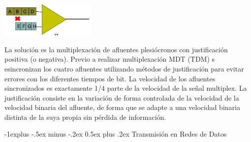 \documentclass[10pt,portrait, twocolumn]{article}
\makeatletter
\renewcommand{\subsection}{\@startsection{subsection}{2}{0mm}%
                                {-1explus -.5ex minus -.2ex}%
                                {0.5ex plus .2ex}%
                                {\normalfont\normalsize\bfseries}}
\makeatother
\begin{document}
\begin{center}
\includegraphics[width=0.35\textwidth]{Problemas}
\end{center}

La solución es la multiplexación de afluentes plesiócronos con justificación positiva (o negativa). Previo a realizar multiplexación MDT (TDM) s esincronizan los cuatro afluentes utilizando métodos de justificación para evitar errores con los diferentes tiempos de bit. La velocidad de los afluentes sincronizados es exactamente 1/4 parte de la velocidad de la señal multiplex. La justificación consiste en la variación de forma controlada de la velocidad de la velocidad binaria del afluente, de forma que se adapte a una velocidad binaria distinta de la suya propia sin pérdida de información.


\subsection{Transmisión en Redes de Datos}


	
	




\end{document}
